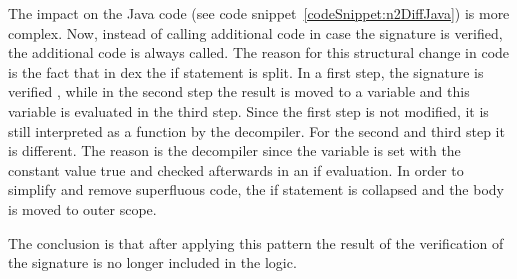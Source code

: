The impact on the Java code (see code snippet~\ref{codeSnippet:n2DiffJava}) is more complex.
Now, instead of calling additional code in case the signature is verified, the additional code is always called.
The reason for this structural change in code is the fact that in dex the if statement is split.
In a first step, the signature is verified , while in the second step the result is moved to a variable and this variable is evaluated in the third step.
Since the first step is not modified, it is still interpreted as a function by the decompiler.
For the second and third step it is different.
The reason is the decompiler since the variable is set with the constant value true and checked afterwards in an if evaluation.
In order to simplify and remove superfluous code, the if statement is collapsed and the body is moved to outer scope.
\newline

The conclusion is that after applying this pattern the result of the verification of the signature is no longer included in the logic.
